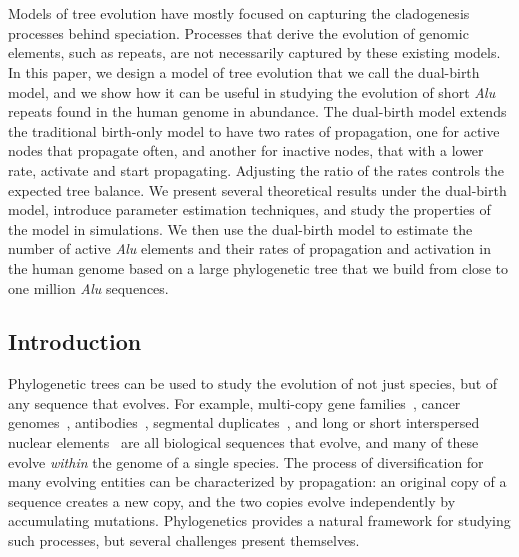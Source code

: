 \newcommand{\BL}{D}
\newcommand{\CH}[1]{c(#1)}
\newcommand{\LB}[1]{l_{#1}}
\newcommand{\LBh}{n_l}
\newcommand{\NV}{N}
\newcommand{\RBh}{n_r}
\newcommand{\RN}{\psi}
\newcommand{\RNALL}{\Psi}
\newcommand{\SD}{\omega}
\newcommand{\SDALL}{\Omega}
\newcommand{\TO}{T^\SD}
\newcommand{\TR}{T^\RN}
\newcommand{\TRO}{\TR_{\SD}}
\newcommand{\bl}{\delta}
\newcommand{\child}[2]{#1_{#2}}
\newcommand{\defeq}{=}
\newcommand{\la}{\lambda_a}
\newcommand{\lb}{\lambda_b}
\newcommand{\leaf}{\otimes}
\newcommand{\tO}{t^\SD}

\newtheorem{conjecture}{Conjecture}
\newtheorem{corollary}{Corollary}
\newtheorem{lemma}{Lemma}
\newtheorem{theorem}{Theorem}

\chapter{\dualbirthtitle}
\label{chap:dualbirth}
\clearpage

Models of tree evolution have mostly focused on capturing the cladogenesis processes behind speciation. Processes that derive the evolution of genomic elements, such as repeats, are not necessarily captured by these existing models. In this paper, we design a model of tree evolution that we call the dual-birth model, and we show how it can be useful in studying the evolution of short \textit{Alu} repeats found in the human genome in abundance. The dual-birth model extends the traditional birth-only model to have two rates of propagation, one for active nodes that propagate often, and another for inactive nodes, that with a lower rate, activate and start propagating. Adjusting the ratio of the rates controls the expected tree balance. We present several theoretical results under the dual-birth model, introduce parameter estimation techniques, and study the properties of the model in simulations. We then use the dual-birth model to estimate the number of active \textit{Alu} elements and their rates of propagation and activation in the human genome based on a large phylogenetic tree that we build from close to one million \textit{Alu} sequences.

\section{Introduction}
Phylogenetic trees can be used to study the evolution of not just species, but of any sequence that evolves. For example, multi-copy gene families~\cite{Page1997,Finn2014}, cancer genomes~\cite{Nowell1976,El-Kebir2016}, antibodies~\cite{Litman1993,Robinson2015,Safonova2015}, segmental duplicates~\cite{Bailey2006,Jiang2007}, and long or short interspersed nuclear elements~\cite{Dewannieux2003} are all biological sequences that evolve, and many of these evolve \textit{within} the genome of a single species. The process of diversification for many evolving entities can be characterized by propagation: an original copy of a sequence creates a new copy, and the two copies evolve independently by accumulating mutations. Phylogenetics provides a natural framework for studying such processes, but several challenges present themselves.

